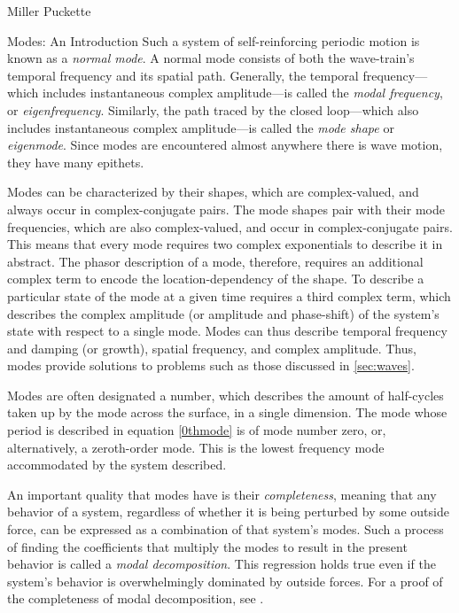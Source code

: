 \documentclass[a4paper,10pt]{report}
\numberwithin{equation}{section}
\begin{document}
\begin{chapter}{Miller Puckette}
\begin{section}{Modes: An Introduction}
Such a system of self-reinforcing periodic motion is known as a \emph{normal mode}. A normal mode consists of both the wave-train's temporal frequency and its spatial path. Generally, the temporal frequency---which includes instantaneous complex amplitude---is called the \emph{modal frequency}, or \emph{eigenfrequency}. Similarly, the path traced by the closed loop---which also includes instantaneous complex amplitude---is called the \emph{mode shape} or \emph{eigenmode}. Since modes are encountered almost anywhere there is wave motion, they have many epithets. \cite[p.~319]{Cremer1973}

Modes can be characterized by their shapes, which are complex-valued, and always occur in complex-conjugate pairs. The mode shapes pair with their mode frequencies, which are also complex-valued, and occur in complex-conjugate pairs. This means that every mode requires two complex exponentials to describe it in abstract. The phasor description of a mode, therefore, requires an additional complex term to encode the location-dependency of the shape. To describe a particular state of the mode at a given time requires a third complex term, which describes the complex amplitude (or amplitude and phase-shift) of the system's state with respect to a single mode. Modes can thus describe temporal frequency and damping (or growth), spatial frequency, and complex amplitude. Thus, modes provide solutions to problems such as those discussed in \ref{sec:waves}. 

Modes are often designated a number, which describes the amount of half-cycles taken up by the mode across the surface, in a single dimension. The mode whose period is described in equation \eqref{0thmode} is of mode number zero, or, alternatively, a zeroth-order mode. This is the lowest frequency mode accommodated by the system described.

An important quality that modes have is their \emph{completeness}, meaning that any behavior of a system, regardless of whether it is being perturbed by some outside force, can be expressed as a combination of that system's modes. Such a process of finding the coefficients that multiply the modes to result in the present behavior is called a \emph{modal decomposition}. This regression holds true even if the system's behavior is overwhelmingly dominated by outside forces. For a proof of the completeness of modal decomposition, see \cite[p.~281]{Courant1937}.


\end{section}
\end{chapter}
\end{document}
